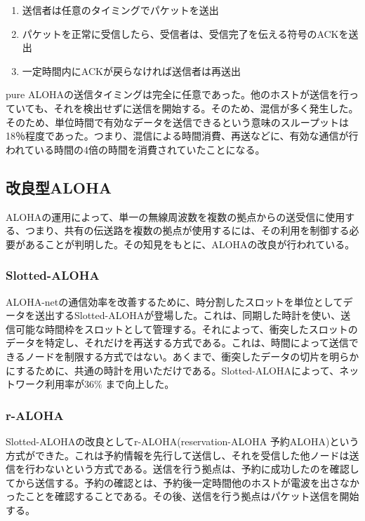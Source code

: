 \begin{enumerate}
\item 送信者は任意のタイミングでパケットを送出
\item パケットを正常に受信したら、受信者は、受信完了を伝える符号のACKを送出
\item 一定時間内にACKが戻らなければ送信者は再送出
\end{enumerate}

pure ALOHAの送信タイミングは完全に任意であった。他のホストが送信を行っていても、それを検出せずに送信を開始する。そのため、混信が多く発生した。そのため、単位時間で有効なデータを送信できるという意味のスループットは 18％程度であった。つまり、混信による時間消費、再送などに、有効な通信が行われている時間の4倍の時間を消費されていたことになる。

\subsection{改良型ALOHA}

ALOHAの運用によって、単一の無線周波数を複数の拠点からの送受信に使用する、つまり、共有の伝送路を複数の拠点が使用するには、その利用を制御する必要があることが判明した。その知見をもとに、ALOHAの改良が行われている。

\subsubsection{Slotted-ALOHA}

ALOHA-netの通信効率を改善するために、時分割したスロットを単位としてデータを送出するSlotted-ALOHAが登場した。これは、同期した時計を使い、送信可能な時間枠をスロットとして管理する。それによって、衝突したスロットのデータを特定し、それだけを再送する方式である。これは、時間によって送信できるノードを制限する方式ではない。あくまで、衝突したデータの切片を明らかにするために、共通の時計を用いただけである。Slotted-ALOHAによって、ネットワーク利用率が36\% まで向上した。

\subsubsection{r-ALOHA}

Slotted-ALOHAの改良としてr-ALOHA(reservation-ALOHA 予約ALOHA)という方式ができた。これは予約情報を先行して送信し、それを受信した他ノードは送信を行わないという方式である。送信を行う拠点は、予約に成功したのを確認してから送信する。予約の確認とは、予約後一定時間他のホストが電波を出さなかったことを確認することである。その後、送信を行う拠点はパケット送信を開始する。

